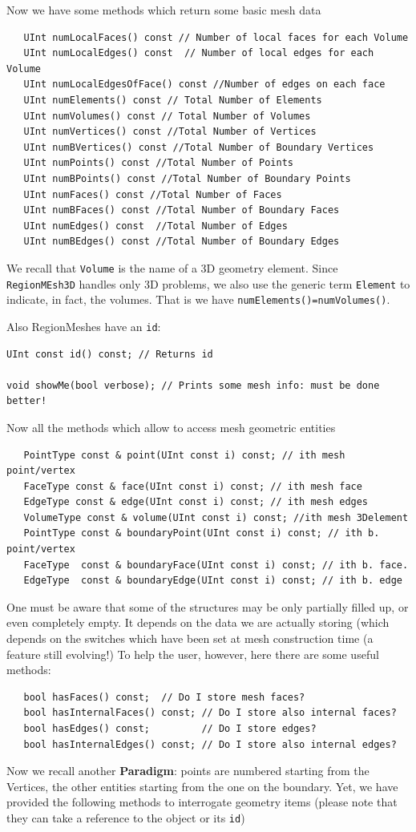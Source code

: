 Now we have some methods which return some basic mesh data
\begin{verbatim}
   UInt numLocalFaces() const // Number of local faces for each Volume
   UInt numLocalEdges() const  // Number of local edges for each Volume
   UInt numLocalEdgesOfFace() const //Number of edges on each face
   UInt numElements() const // Total Number of Elements
   UInt numVolumes() const // Total Number of Volumes
   UInt numVertices() const //Total Number of Vertices
   UInt numBVertices() const //Total Number of Boundary Vertices
   UInt numPoints() const //Total Number of Points
   UInt numBPoints() const //Total Number of Boundary Points
   UInt numFaces() const //Total Number of Faces
   UInt numBFaces() const //Total Number of Boundary Faces
   UInt numEdges() const  //Total Number of Edges
   UInt numBEdges() const //Total Number of Boundary Edges
\end{verbatim}
We recall that \texttt{Volume} is the name of a 3D geometry element.
Since \texttt{RegionMEsh3D} handles only 3D problems, we also use the
generic term \texttt{Element} to indicate, in fact, the volumes. That
is we have \texttt{numElements()=numVolumes()}.

Also RegionMeshes have an \texttt{id}:
\begin{verbatim}
UInt const id() const; // Returns id

void showMe(bool verbose); // Prints some mesh info: must be done better!
\end{verbatim}
Now all the methods which allow to access mesh geometric entities
\begin{verbatim}
   PointType const & point(UInt const i) const; // ith mesh point/vertex
   FaceType const & face(UInt const i) const; // ith mesh face 
   EdgeType const & edge(UInt const i) const; // ith mesh edges  
   VolumeType const & volume(UInt const i) const; //ith mesh 3Delement
   PointType const & boundaryPoint(UInt const i) const; // ith b. point/vertex
   FaceType  const & boundaryFace(UInt const i) const; // ith b. face.
   EdgeType  const & boundaryEdge(UInt const i) const; // ith b. edge
\end{verbatim}
One must be aware that some of the structures may be only partially
filled up, or even completely empty. It depends on the data we are
actually storing (which depends on the switches which have been set at
mesh construction time (a feature still evolving!)
To help the user, however, here there are some useful methods:
\begin{verbatim}
   bool hasFaces() const;  // Do I store mesh faces?
   bool hasInternalFaces() const; // Do I store also internal faces?
   bool hasEdges() const;         // Do I store edges?
   bool hasInternalEdges() const; // Do I store also internal edges?
\end{verbatim}
Now we recall another \textbf{Paradigm}: points are numbered starting
from the Vertices, the other entities starting from the one on the
boundary.  Yet, we have provided the following methods to interrogate
geometry items (please note that they can take a reference to the
object or its \texttt{id})

